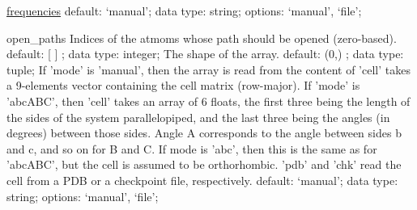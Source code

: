 \begin{ipifield}{}
\begin{ipifield}{\hyperref[NMFREQUENCIES]{frequencies}}
{{default: `manual'; data type: string; options: `manual', `file'; }%
}
\end{ipifield}
\begin{ipifield}{open\_paths}%
{Indices of the atmoms whose path should be opened (zero-based).}%
{default:  [ ] ; data type: integer; }%
{%
{The shape of the array.}%
{default:  (0,) ; data type: tuple; }%
%
{If 'mode' is 'manual', then the array is read from the content of 'cell' takes a 9-elements vector containing the cell matrix (row-major). If 'mode' is 'abcABC', then 'cell' takes an array of 6 floats, the first three being the length of the sides of the system parallelopiped, and the last three being the angles (in degrees) between those sides. Angle A corresponds to the angle between sides b and c, and so on for B and C. If mode is 'abc', then this is the same as for 'abcABC', but the cell is assumed to be orthorhombic. 'pdb' and 'chk' read the cell from a PDB or a checkpoint file, respectively.}%
{default: `manual'; data type: string; options: `manual', `file'; }%
}
\end{ipifield}
\end{ipifield}
